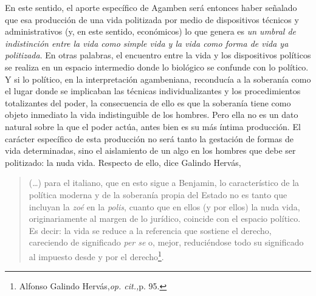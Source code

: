 En este sentido, el aporte específico de Agamben será entonces haber
señalado que esa producción de una vida politizada por medio de
dispositivos técnicos y administrativos (y, en este sentido, económicos)
lo que genera es \emph{un umbral de indistinción entre la vida como
simple vida y la vida como forma de vida ya politizada}. En otras
palabras, el encuentro entre la vida y los dispositivos políticos se
realiza en un espacio intermedio donde lo biológico se confunde con lo
político. Y si lo político, en la interpretación agambeniana, reconducía
a la soberanía como el lugar donde se implicaban las técnicas
individualizantes y los procedimientos totalizantes del poder, la
consecuencia de ello es que la soberanía tiene como objeto inmediato la
vida indistinguible de los hombres. Pero ella no es un dato natural
sobre la que el poder actúa, antes bien es su más íntima producción. El
carácter específico de esta producción no será tanto la gestación de
formas de vida determinadas, sino el aislamiento de un algo en los
hombres que debe ser politizado: la nuda vida. Respecto de ello, dice
Galindo Hervás,

\begin{quote}
(\dots) para el italiano, que en esto sigue a Benjamin, lo
característico de la política moderna y de la soberanía propia del
Estado no es tanto que incluyan la \emph{zoé} en la \emph{polis}, cuanto
que en ellos (y por ellos) la nuda vida, originariamente al margen de lo
jurídico, coincide con el espacio político. Es decir: la vida se reduce
a la referencia que sostiene el derecho, careciendo de significado
\emph{per se} o, mejor, reduciéndose todo su significado al impuesto
desde y por el derecho\footnote{Alfonso Galindo Hervás,\emph{op.
  cit.,}p. 95.}.
\end{quote}

